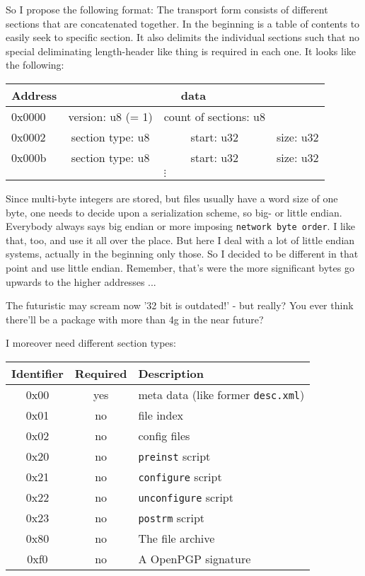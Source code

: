 \documentclass[a4paper]{scrartcl}
\newcommand{\file}[1]{\texttt{#1}}
\newcommand{\script}[1]{\texttt{#1}}
\begin{document}
	So I propose the following format: The transport form consists of different sections that are concatenated together. In the beginning is a table of contents to easily seek to specific section. It also delimits the individual sections such that no special deliminating length-header like thing is required in each one. It looks like the following:
	
	\vspace{1eM}
	
	\begin{center}
		\begin{tabular}{|l|c|c|c|}
			\hline
			Address & \multicolumn{3}{c|}{data} \\
			\hline
			0x0000 & version: u8 (= 1) & count of sections: u8 & \\
			\hline
			0x0002 & section type: u8 & start: u32 & size: u32 \\
			\hline
			0x000b & section type: u8 & start: u32 & size: u32 \\
			\hline
			\multicolumn{4}{|c|}{$\vdots$} \\
			\hline
		\end{tabular}
	\end{center}
	
	\vspace{1eM}
	
	Since multi-byte integers are stored, but files usually have a word size of one byte, one needs to decide upon a serialization scheme, so big- or little endian. Everybody always says big endian or more imposing \texttt{network byte order}. I like that, too, and use it all over the place. But here I deal with a lot of little endian systems, actually in the beginning only those. So I decided to be different in that point and use little endian. Remember, that's were the more significant bytes go upwards to the higher addresses ...
	
	The futuristic may scream now '32 bit is outdated!' - but really? You ever think there'll be a package with more than 4g in the near future?

	
	\vspace{1eM}	
	I moreover need different section types:
	
	\vspace{1em}

	\begin{tabularx}{\textwidth}{c|c|X}
		Identifier & Required & Description \\
		\hline
		0x00 & yes & meta data (like former \file{desc.xml}) \\
		0x01 & no & file index \\
		0x02 & no & config files \\
		0x20 & no & \script{preinst} script \\
		0x21 & no & \script{configure} script \\
		0x22 & no & \script{unconfigure} script \\
		0x23 & no & \script{postrm} script \\
		0x80 & no & The file archive \\
		0xf0 & no & A OpenPGP signature \\
	\end{tabularx}
\end{document}
